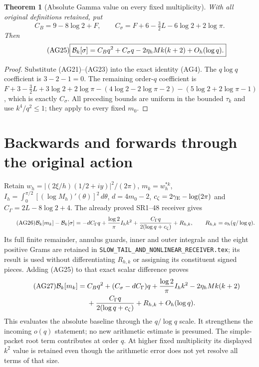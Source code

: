 \documentclass[11pt,a4paper]{article}
\newtheorem{theorem}{Theorem}[section]
\providecommand{\dd}{\,d}
\begin{document}
\begin{theorem}[Absolute Gamma value on every fixed multiplicity]
With all original definitions retained, put
\begin{equation}\tag{AG24}
 C_B=9-8\log2+F,\qquad
 C_\sigma=F+6-\tfrac32L-6\log2+2\log\pi.
\end{equation}
Then
\begin{equation}\tag{AG25}
 \boxed{\mathcal B_k[\sigma]=C_Bq^2+C_\sigma q
       -2\eta_hM k(k+2)+O_h(\log q).}
\end{equation}
\end{theorem}
\begin{proof}
Substitute (AG21)--(AG23) into the exact identity (AG4).
The $q\log q$ coefficient is $3-2-1=0$.
The remaining order-$q$ coefficient is
$F+3-\tfrac32L+3\log2+2\log\pi
-(4\log2-2\log\pi-2)-(5\log2+2\log\pi-1)$,
which is exactly $C_\sigma$. All preceding bounds are uniform in the
bounded $\tau_k$ and use $k^4/q^2\le1$; they apply to every fixed $m_0$.
\end{proof}

\section{Backwards and forwards through the original action}
Retain $w_h=|(2\xi/h)(1/2+iy)|^2/(2\pi)$, $m_k=w_h^{*k}$,
$I_h=\int_0^{\pi/2}[(\log M_h)'(\theta)]^2\dd\theta$,
$d=4m_0-2$, $c_\zeta=2\gamma_{\rm E}-\log(2\pi)$ and
$C_\Gamma=2L-8\log2+4$. The already proved SR1--48 receiver gives
\begin{equation}\tag{AG26}
 \mathcal B_k[m_k]-\mathcal B_k[\sigma]
 =-dC_\Gamma q+\frac{\log2}{\pi}I_hk^2
  +\frac{C_\Gamma q}{2(\log q+c_\zeta)}+R_{h,k},
 \qquad R_{h,k}=o_h(q/\log q).
\end{equation}
Its full finite remainder, annulus guards, inner and outer integrals and
the eight positive Grams are retained in
\texttt{SLOW\_TAIL\_AND\_NONLINEAR\_RECEIVER.tex}; its result is used
without differentiating $R_{h,k}$ or assigning its constituent signed pieces.
Adding (AG25) to that exact scalar difference proves
\begin{align}\tag{AG27}
 \mathcal B_k[m_k]={}&C_Bq^2+(C_\sigma-dC_\Gamma)q
 +\frac{\log2}{\pi}I_hk^2-2\eta_hMk(k+2)\\
 &+\frac{C_\Gamma q}{2(\log q+c_\zeta)}
 +R_{h,k}+O_h(\log q).\notag
\end{align}
This evaluates the absolute baseline through the $q/\log q$ scale.
It strengthens the incoming $o(q)$ statement; no new arithmetic estimate
is presumed. The simple-packet root term contributes at order $q$.
At higher fixed multiplicity its displayed $k^2$ value is retained even
though the arithmetic error does not yet resolve all terms of that size.
\end{document}

